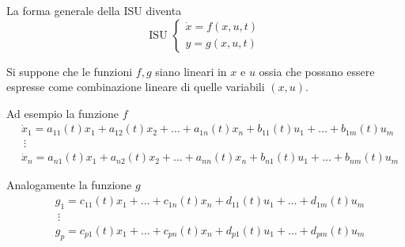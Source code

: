 La forma generale della ISU diventa
\begin{equation}\text{ISU }\left\{
\begin{aligned}
\dot{x} = f(x,u,t)\\
y = g(x,u,t)
\end{aligned}\right.
\label{eq.:ISU_compatta}
\end{equation}

Si suppone che le funzioni $f,g$ siano lineari in $x$ e $u$ ossia che possano essere espresse come
combinazione lineare di quelle variabili $(x,u)$.

Ad esempio la funzione $f$
$$\begin{aligned}
&\dot{x}_1 = a_{11}(t)x_1+a_{12}(t)x_2 + \ldots + a_{1n}(t)x_n + b_{11}(t)u_1+\ldots+b_{1m}(t)u_m\\
&\ \vdots\\
&\dot{x}_n = a_{n1}(t)x_1 +  a_{n2}(t)x_2 + \ldots + a_{nn}(t)x_n + b_{n1}(t)u_1+\ldots+b_{nm}(t)u_m
\end{aligned}
$$

Analogamente la funzione $g$
$$\begin{aligned}
&g_1 = c_{11}(t)x_1 + \ldots + c_{1n}(t)x_n + d_{11}(t)u_1 + \ldots + d_{1m}(t)u_m\\
&\ \vdots\\
&g_p = c_{p1}(t)x_1 + \ldots + c_{pn}(t)x_n + d_{p1}(t)u_1+\ldots+d_{pm}(t)u_m
\end{aligned}$$

